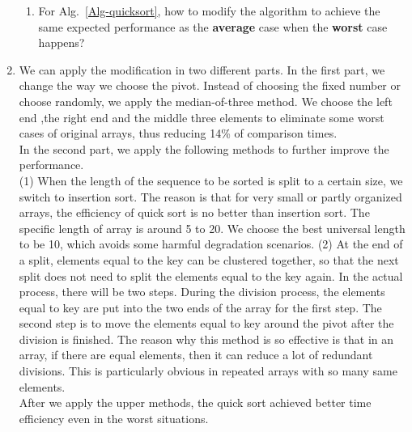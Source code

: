 \documentclass[12pt,a4paper]{article}
\makeatletter
\newtheorem*{solution}{Solution}
\theoremstyle{definition}
\renewenvironment{solution}[1][Solution] {\par\pushQED{\qed}\normalfont\topsep6\p@\@plus6\p@\relax\trivlist\item[\hskip\labelsep\bfseries#1\@addpunct{.}]\ignorespaces}{\popQED\endtrivlist\@endpefalse} \makeatother
\makeatother
\begin{document}
\begin{enumerate}
\begin{enumerate}
\item For Alg.~\ref{Alg-quicksort}, how to modify the algorithm to achieve the same expected performance as the \textbf{average} case when the \textbf{worst} case happens?
\end{enumerate} 
    \begin{solution}
       We can apply the modification in two different parts. In the first part, we change the way we choose the pivot. Instead of choosing the fixed number or choose randomly, we apply the median-of-three method. We choose the left end ,the right end and the middle three elements to eliminate some worst cases of original arrays, thus reducing 14\% of comparison times. \\
       In the second part, we apply the following methods to further improve the performance. \\
       (1) When the length of the sequence to be sorted is split to a certain size, we switch to insertion sort. The reason is that for very small or partly organized arrays, the efficiency of quick sort is no better than insertion sort. The specific length of array is around 5 to 20. We choose the best universal length to be 10, which avoids some harmful degradation scenarios.
       (2) At the end of a split, elements equal to the key can be clustered together, so that the next split does not need to split the elements equal to the key again. In the actual process, there will be two steps. During the division process, the elements equal to key are put into the two ends of the array for the first step.
       The second step is to move the elements equal to key around the pivot after the division is finished. The reason why this method is so effective is that in an array, if there are equal elements, then it can reduce a lot of redundant divisions. This is particularly obvious in repeated arrays with so many same elements.\\
       After we apply the upper methods, the quick sort achieved better time efficiency even in the worst situations. 
    \end{solution}


\end{enumerate}
\end{document}
